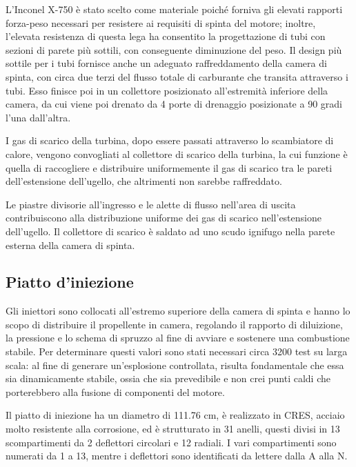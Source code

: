 L’Inconel X-750 è stato scelto come materiale poiché forniva gli elevati rapporti forza-peso necessari per resistere ai requisiti di spinta del motore; inoltre, l'elevata resistenza di questa lega ha consentito la progettazione di tubi con sezioni di parete più sottili, con conseguente diminuzione del peso. Il design più sottile per i tubi fornisce anche un adeguato raffreddamento della camera di spinta, con circa due terzi del flusso totale di carburante che transita attraverso i tubi. Esso finisce poi in un collettore posizionato all'estremità inferiore della camera, da cui viene poi drenato da 4 porte di drenaggio posizionate a 90 gradi l'una dall'altra.

I gas di scarico della turbina, dopo essere passati attraverso lo scambiatore di calore, vengono convogliati al collettore di scarico della turbina, la cui funzione è quella di raccogliere e distribuire uniformemente il gas di scarico tra le pareti dell’estensione dell'ugello, che altrimenti non sarebbe raffreddato.

Le piastre divisorie all'ingresso e le alette di flusso nell'area di uscita contribuiscono alla distribuzione uniforme dei gas di scarico nell'estensione dell'ugello. Il collettore di scarico è saldato ad uno scudo ignifugo nella parete esterna della camera di spinta.

\subsection{Piatto d'iniezione}
\label{subsec:piatto iniezione}


Gli iniettori sono collocati all’estremo superiore della camera di spinta e hanno lo scopo di distribuire il propellente in camera, regolando il rapporto di diluizione, la pressione e lo schema di spruzzo al fine di avviare e sostenere una combustione stabile. Per determinare questi valori sono stati necessari circa 3200 test su larga scala: al fine di generare un’esplosione controllata, risulta fondamentale che essa sia dinamicamente stabile, ossia che sia prevedibile e non crei punti caldi che porterebbero alla fusione di componenti del motore.

Il piatto di iniezione ha un diametro di 111.76 cm, è realizzato in CRES, acciaio molto resistente alla corrosione, ed è strutturato in 31 anelli, questi divisi in 13 scompartimenti da 2 deflettori circolari e 12 radiali. I vari compartimenti sono numerati da 1 a 13, mentre i deflettori sono identificati da lettere dalla A alla N.

